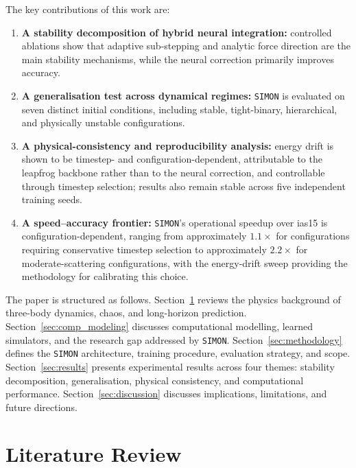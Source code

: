 \documentclass[12pt]{article}
\begin{document}
The key contributions of this work are:
\begin{enumerate}
    \item \textbf{A stability decomposition of hybrid neural integration:} controlled ablations show that adaptive sub-stepping and analytic force direction are the main stability mechanisms, while the neural correction primarily improves accuracy.

    \item \textbf{A generalisation test across dynamical regimes:} \texttt{SIMON} is evaluated on seven distinct initial conditions, including stable, tight-binary, hierarchical, and physically unstable configurations.

    \item \textbf{A physical-consistency and reproducibility analysis:} energy drift is shown
to be timestep- and configuration-dependent, attributable to the leapfrog
backbone rather than to the neural correction, and controllable through timestep
selection; results also remain stable across five independent training seeds.

    \item \textbf{A speed--accuracy frontier:} \texttt{SIMON}'s operational
speedup over ias15 is configuration-dependent, ranging from approximately $1.1\times$
for configurations requiring conservative timestep selection to approximately
$2.2\times$ for moderate-scattering configurations, with the energy-drift
sweep providing the methodology for calibrating this choice.
\end{enumerate}

The paper is structured as follows.
Section~\ref{sec:lit_review} reviews the physics background of three-body dynamics,
chaos, and long-horizon prediction.
Section~\ref{sec:comp_modeling} discusses computational modelling, learned simulators,
and the research gap addressed by \texttt{SIMON}.
Section~\ref{sec:methodology} defines the \texttt{SIMON} architecture, training procedure,
evaluation strategy, and scope.
Section~\ref{sec:results} presents experimental results across four themes:
stability decomposition, generalisation, physical consistency, and computational
performance.
Section~\ref{sec:discussion} discusses implications, limitations, and future
directions.

\section{Literature Review}
\label{sec:lit_review}
\end{document}
